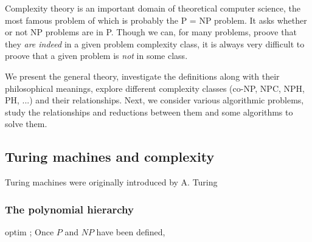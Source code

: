 Complexity theory is an important domain of theoretical computer science, the most famous problem of which is probably the \og P = NP \fg problem. It asks whether or not NP problems are in P. Though we can, for many problems, proove that they \textit{are indeed} in a given problem complexity class, it is always very difficult to proove that a given problem is \textit{not} in some class.

We present the general theory, investigate the definitions along with their philosophical meanings, explore different complexity classes (co-NP, NPC, NPH, PH, ...) and their relationships. Next, we consider various algorithmic problems, study the relationships and reductions between them and some algorithms to solve them.

\subsection{Turing machines and complexity}

Turing machines were originally introduced by A. Turing \cite{Turing1936} \cite{Turing1992}

\subsubsection{The polynomial hierarchy}
optim ; 
Once $P$ and $NP$ have been defined,